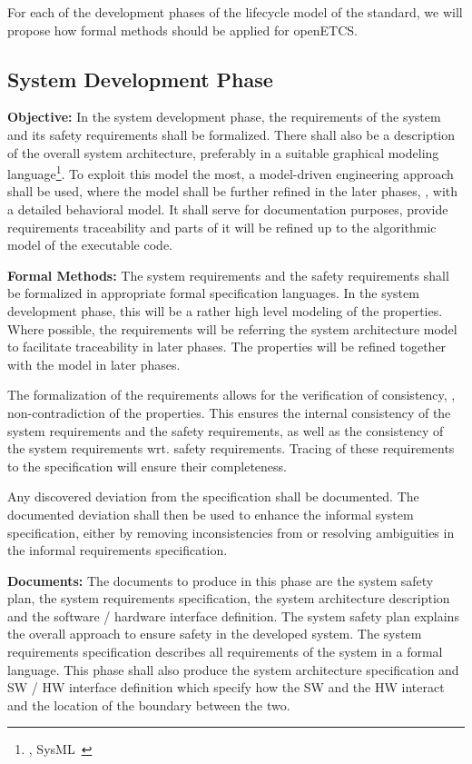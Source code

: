 For each of the development phases of the lifecycle model of the standard, we
will propose how formal methods should be applied for openETCS.

\subsection{System Development Phase}
\label{sec:syst-devel-phase}

{\bf Objective:} In the system development phase, the requirements of the system
and its safety requirements shall be formalized. There shall also be a
description of the overall system architecture, preferably in a suitable
graphical modeling language\footnote{\eg, SysML~\cite{SysMLSpec}}. To exploit
this model the most, a model-driven engineering approach shall be used, where
the model shall be further refined in the later phases, \eg, with a detailed
behavioral model. It shall serve for documentation purposes, provide
requirements traceability and parts of it will be refined up to the algorithmic
model of the executable code.

{\bf Formal Methods:} The system requirements and the safety requirements shall
be formalized in appropriate formal specification languages. In the system
development phase, this will be a rather high level modeling of the
properties. Where possible, the requirements will be referring the system
architecture model to facilitate traceability in later phases. The properties
will be refined together with the model in later phases.

The formalization of the requirements allows for the verification of
consistency, \eg, non-contradiction of the properties. This ensures the internal
consistency of the system requirements and the safety requirements, as well as
the consistency of the system requirements wrt. safety requirements. Tracing of
these requirements to the specification will ensure their completeness.

Any discovered deviation from the specification shall be documented. The
documented deviation shall then be used to enhance the informal system
specification, either by removing inconsistencies from or resolving ambiguities
in the informal requirements specification.

{\bf Documents:} The documents to produce in this phase are the system safety
plan, the system requirements specification, the system architecture description
and the software / hardware interface definition. The system safety plan
explains the overall approach to ensure safety in the developed system. The
system requirements specification describes all requirements of the system in a
formal language. This phase shall also produce the system architecture
specification and SW / HW interface definition which specify how the SW and the
HW interact and the location of the boundary between the two.

